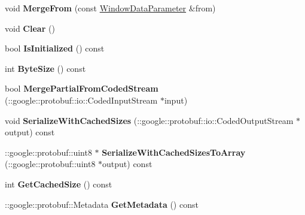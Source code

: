 \begin{DoxyCompactItemize}
void {\bfseries Merge\+From} (const \mbox{\hyperlink{classcaffe_1_1_window_data_parameter}{Window\+Data\+Parameter}} \&from)
\item 
\mbox{\label{classcaffe_1_1_window_data_parameter_ae2e14bc4a3381e54fcdcdd71171f98f7}} 
void {\bfseries Clear} ()
\item 
\mbox{\label{classcaffe_1_1_window_data_parameter_a3221a39adddb31e2affe805e4f7f947e}} 
bool {\bfseries Is\+Initialized} () const
\item 
\mbox{\label{classcaffe_1_1_window_data_parameter_aa7567ce7ffbb847f0425a85d9a6b760a}} 
int {\bfseries Byte\+Size} () const
\item 
\mbox{\label{classcaffe_1_1_window_data_parameter_aca8c6b88bb7f15ee7d248f8497ad44d4}} 
bool {\bfseries Merge\+Partial\+From\+Coded\+Stream} (\+::google\+::protobuf\+::io\+::\+Coded\+Input\+Stream $\ast$input)
\item 
\mbox{\label{classcaffe_1_1_window_data_parameter_ac47181ac7a2918466e3e157d4dbcd360}} 
void {\bfseries Serialize\+With\+Cached\+Sizes} (\+::google\+::protobuf\+::io\+::\+Coded\+Output\+Stream $\ast$output) const
\item 
\mbox{\label{classcaffe_1_1_window_data_parameter_ada9fba41f01a5e90a9499f54bed05045}} 
\+::google\+::protobuf\+::uint8 $\ast$ {\bfseries Serialize\+With\+Cached\+Sizes\+To\+Array} (\+::google\+::protobuf\+::uint8 $\ast$output) const
\item 
\mbox{\label{classcaffe_1_1_window_data_parameter_a4a442f17a910b25fed3bffb516a7601c}} 
int {\bfseries Get\+Cached\+Size} () const
\item 
\mbox{\label{classcaffe_1_1_window_data_parameter_aaf8577f7b45f289ab7d09336bc07883b}} 
\+::google\+::protobuf\+::\+Metadata {\bfseries Get\+Metadata} () const
\item 
\mbox{\label{classcaffe_1_1_window_data_parameter_ac50911efe6e807410508037c77b8570e}} 

\end{DoxyCompactItemize}
